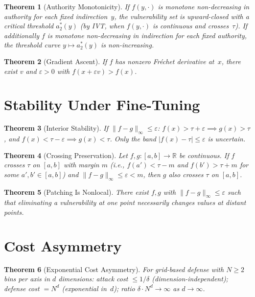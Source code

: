 \documentclass[11pt]{article}
\newtheorem{theorem}{Theorem}[section]
\newcommand{\R}{\mathbb{R}}
\begin{document}
\begin{theorem}[Authority Monotonicity]
\label{thm:authority}
If $f(y,\cdot)$ is monotone non-decreasing in authority for each fixed
indirection~$y$, the vulnerability set is upward-closed with a critical
threshold $a^*_2(y)$ (by IVT, when $f(y,\cdot)$ is continuous and
crosses~$\tau$). If additionally $f$ is monotone non-decreasing in
indirection for each fixed authority, the threshold curve
$y \mapsto a^*_2(y)$ is non-increasing.
\end{theorem}

\begin{theorem}[Gradient Ascent]
\label{thm:gradient}
If $f$ has nonzero Fr\'{e}chet derivative at~$x$, there exist $v$ and
$\varepsilon > 0$ with $f(x + \varepsilon v) > f(x)$.
\end{theorem}


\section{Stability Under Fine-Tuning}
\label{app:stability}

\begin{theorem}[Interior Stability]
\label{thm:interior-stable}
If $\|f - g\|_\infty \leq \varepsilon$:
$f(x) > \tau + \varepsilon \implies g(x) > \tau$, and
$f(x) < \tau - \varepsilon \implies g(x) < \tau$.
Only the band $|f(x) - \tau| \leq \varepsilon$ is uncertain.
\end{theorem}

\begin{theorem}[Crossing Preservation]
\label{thm:crossing}
Let $f, g\colon [a,b] \to \R$ be continuous. If $f$ crosses $\tau$
on $[a,b]$ with margin $m$ (i.e., $f(a') < \tau - m$ and
$f(b') > \tau + m$ for some $a', b' \in [a,b]$) and
$\|f - g\|_\infty \leq \varepsilon < m$, then $g$ also crosses
$\tau$ on $[a,b]$.
\end{theorem}

\begin{theorem}[Patching Is Nonlocal]
\label{thm:nonlocal}
There exist $f, g$ with $\|f-g\|_\infty \leq \varepsilon$ such that
eliminating a vulnerability at one point necessarily changes values at
distant points.
\end{theorem}


\section{Cost Asymmetry}
\label{app:cost}

\begin{theorem}[Exponential Cost Asymmetry]
\label{thm:cost}
For grid-based defense with $N \geq 2$ bins per axis in $d$ dimensions:
attack cost $\leq 1/\delta$ (dimension-independent); defense cost
$= N^d$ (exponential in~$d$); ratio
$\delta \cdot N^d \to \infty$ as $d\to\infty$.
\end{theorem}
\end{document}
